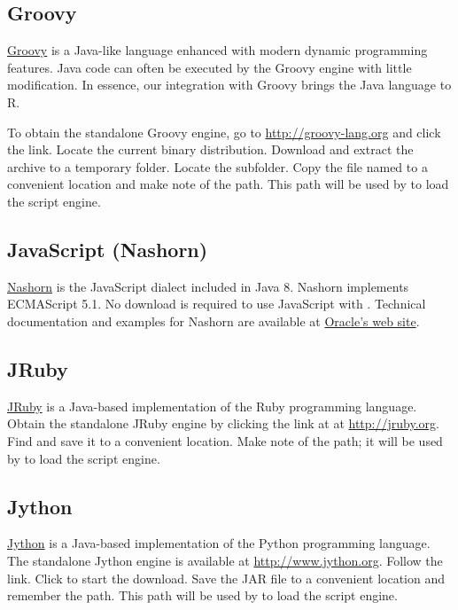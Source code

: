 \subsection{Groovy}

\href{http://groovy-lang.org}{Groovy} is a Java-like language enhanced with modern dynamic programming features. Java code can often be executed by the Groovy engine with little modification. In essence, our integration with Groovy brings the Java language to R.

To obtain the standalone Groovy engine, go to \url{http://groovy-lang.org} and click the  link. Locate the current binary distribution. Download and extract the archive to a temporary folder. Locate the  subfolder. Copy the file named  to a convenient location and make note of the path. This path will be used by  to load the script engine.

\subsection{JavaScript (Nashorn)}

\href{https://docs.oracle.com/javase/8/docs/technotes/guides/scripting/nashorn/}{Nashorn} is the JavaScript dialect included in Java 8. Nashorn implements ECMAScript 5.1. No download is required to use JavaScript with . Technical documentation and examples for Nashorn are available at \href{https://docs.oracle.com/javase/8/docs/technotes/guides/scripting/nashorn/}{Oracle's web site}.

\subsection{JRuby}

\href{http://jruby.org}{JRuby} is a Java-based implementation of the Ruby programming language. Obtain the standalone JRuby engine by clicking the  link at at \url{http://jruby.org}. Find  and save it to a convenient location. Make note of the path; it will be used by  to load the script engine.

\subsection{Jython}

\href{http://www.jython.org}{Jython} is a Java-based implementation of the Python programming language. The standalone Jython engine is available at \url{http://www.jython.org}. Follow the  link. Click  to start the download. Save the JAR file to a convenient location and remember the path. This path will be used by  to load the script engine.

